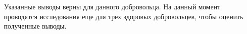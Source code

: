 \documentclass[conference]{IEEEtran}
\begin{document}
Указанные выводы верны для данного добровольца. На данный момент проводятся исследования еще для трех здоровых добровольцев, чтобы оценить полученные выводы.




\vspace{12pt}
\end{document}
